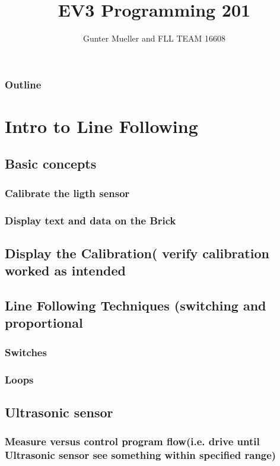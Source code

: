 \documentclass[11pt]{beamer}
\author{Gunter Mueller and FLL TEAM 16608}
\title{EV3 Programming 201}
\begin{document}
\begin{frame}
\titlepage
\end{frame}\maketitle


\begin{frame}
\frametitle{Outline}
\tableofcontents
\end{frame}

\section{Intro to Line Following}
\subsection{Basic concepts}
\subsubsection{Calibrate the ligth sensor}
\subsubsection{Display text and data on the Brick}
\subsection{Display the Calibration( verify calibration worked as intended}
\subsection{Line Following Techniques (switching and proportional}
\subsubsection{Switches}
\subsubsection{Loops}

\subsection{Ultrasonic sensor}
\subsubsection{ Measure versus control program flow(i.e. drive until Ultrasonic sensor see something within specified range)
}
\end{document}
